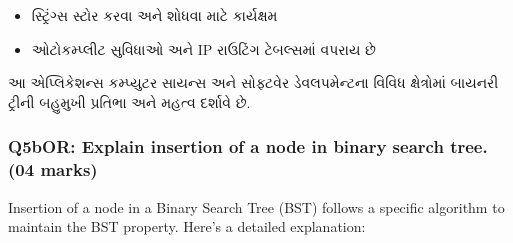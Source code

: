 \begin{enumerate}
  \begin{itemize}
  \tightlist
  \item
    સ્ટ્રિંગ્સ સ્ટોર કરવા અને શોધવા માટે કાર્યક્ષમ
  \item
    ઓટોકમ્પ્લીટ સુવિધાઓ અને IP રાઉટિંગ ટેબલ્સમાં વપરાય છે
  \end{itemize}
\end{enumerate}

આ એપ્લિકેશન્સ કમ્પ્યુટર સાયન્સ અને સોફ્ટવેર ડેવલપમેન્ટના વિવિધ ક્ષેત્રોમાં બાયનરી ટ્રીની
બહુમુખી પ્રતિભા અને મહત્વ દર્શાવે છે.

\hypertarget{q5bor-explain-insertion-of-a-node-in-binary-search-tree.-04-marks}{%
\subsubsection{Q5bOR: Explain insertion of a node in binary search tree.
(04
marks)}\label{q5bor-explain-insertion-of-a-node-in-binary-search-tree.-04-marks}}

Insertion of a node in a Binary Search Tree (BST) follows a specific
algorithm to maintain the BST property. Here's a detailed explanation:

